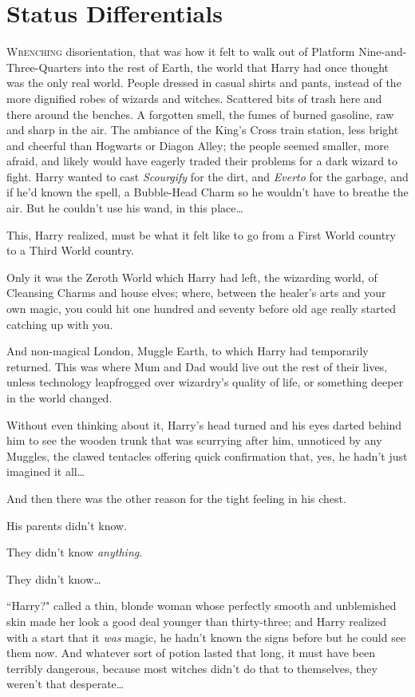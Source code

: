 \chapter{Status Differentials}

\lettrine{W}{renching} disorientation, that was how it felt to walk out of Platform Nine-and-Three-Quarters into the rest of Earth, the world that Harry had once thought was the only real world. People dressed in casual shirts and pants, instead of the more dignified robes of wizards and witches. Scattered bits of trash here and there around the benches. A forgotten smell, the fumes of burned gasoline, raw and sharp in the air. The ambiance of the King's Cross train station, less bright and cheerful than Hogwarts or Diagon Alley; the people seemed smaller, more afraid, and likely would have eagerly traded their problems for a dark wizard to fight. Harry wanted to cast \emph{Scourgify} for the dirt, and \emph{Everto} for the garbage, and if he'd known the spell, a Bubble-Head Charm so he wouldn't have to breathe the air. But he couldn't use his wand, in this place{\ldots}

This, Harry realized, must be what it felt like to go from a First World country to a Third World country.

Only it was the Zeroth World which Harry had left, the wizarding world, of Cleansing Charms and house elves; where, between the healer's arts and your own magic, you could hit one hundred and seventy before old age really started catching up with you.

And non-magical London, Muggle Earth, to which Harry had temporarily returned. This was where Mum and Dad would live out the rest of their lives, unless technology leapfrogged over wizardry's quality of life, or something deeper in the world changed.

Without even thinking about it, Harry's head turned and his eyes darted behind him to see the wooden trunk that was scurrying after him, unnoticed by any Muggles, the clawed tentacles offering quick confirmation that, yes, he hadn't just imagined it all{\ldots}

And then there was the other reason for the tight feeling in his chest.

His parents didn't know.

They didn't know \emph{anything}.

They didn't know{\ldots}

``Harry?" called a thin, blonde woman whose perfectly smooth and unblemished skin made her look a good deal younger than thirty-three; and Harry realized with a start that it \emph{was} magic, he hadn't known the signs before but he could see them now. And whatever sort of potion lasted that long, it must have been terribly dangerous, because most witches didn't do that to themselves, they weren't that desperate{\ldots}

